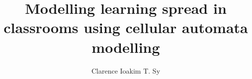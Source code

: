\documentclass[bs]{nip3} %
\title{Modelling learning spread in classrooms using cellular automata modelling} %
\author{Clarence Ioakim T. Sy} %
\begin{document}
\maketitle %
\makePrelim %





\appendix



\end{document}
